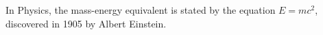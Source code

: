 \documentclass[12pt, letterpaper]{article}
\begin{document}
In Physics, the mass-energy equivalent is stated by the equation $E=mc^2$, discovered in 
1905 by Albert Einstein.
\end{document}
